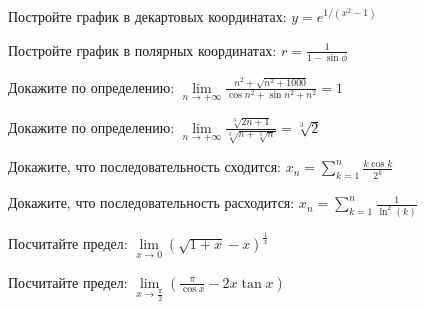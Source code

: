 \documentclass[russian]{article}
\begin{document}
Постройте график в декартовых координатах:
$y = e^{1/(x^2 - 1)}$

Постройте график в полярных координатах:
$r = \frac{1}{1 - \sin\phi}$

Докажите по определению:
$\lim\limits_{n\to+\infty}\frac{n^2 + \sqrt{n^2 + 1000}}{\cos n^2 + \sin n^2 + n^2}=1$

Докажите по определению:
$\lim\limits_{n\to+\infty}\frac{\sqrt[3]{2n + 1}}{\sqrt[3]{n + \sqrt[3]{n}}}=\sqrt[3]{2}$

Докажите, что последовательность сходится:
$x_n=\sum_{k = 1}^{n}\frac{k \cos k}{2^k}$

Докажите, что последовательность расходится:
$x_n=\sum_{k = 1}^{n}\frac{1}{\ln^2(k)}$

Посчитайте предел:
$\lim\limits_{x\to 0} (\sqrt{1 + x} - x)^{\frac{1}{x}}$

Посчитайте предел:
$\lim\limits_{x\to \frac{\pi}{2}} \left(\frac{\pi}{\cos x} - 2x \tan x \right)$
\end{document}
